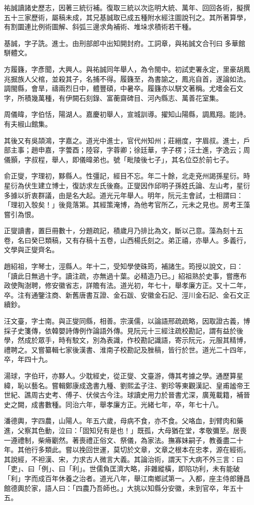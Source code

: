 \begin{pinyinscope}
祐誠讀諸史歷志，因著三統衍補。復取三統以次迄明大統、萬年、回回各術，擬撰五十三家歷術，屬稿未成，其兄基誠取已成五種附水經注圖說刊之。其所著算學，有割圜連比例術圖解、斜弧三邊求角補術、堆垛求積術若干種。

基誠，字子詵。進士。由刑部郎中出知開封府。工詞章，與祐誠文合刊曰多華館駢體文。

方履籛，字彥聞，大興人。與祐誠同年舉人，為令閩中。初試吏署永定，里豪胡鳳兆掘族人父棺，並殺其子，名捕不得。履籛至，為書諭之，鳳兆自首，遂論如法。調閩縣，會旱，禱兩烈日中，體豐碩，中暑卒。履籛亦以駢文著稱。尤嗜金石文字，所積幾萬種，有伊闕石刻錄、富蘅齋碑目、河內縣志、萬善花室集。

周儀暐，字伯恬，陽湖人。嘉慶初舉人，宣城訓導。擢知山陽縣，調鳳翔。能詩。有夫椒山館集。

其後又有吳頡鴻，字嘉之。道光中進士，官代州知州；莊縉度，字眉叔。進士，戶部主事；趙申嘉，字蕓酉；陸容，字蓉卿；徐廷華，字子楞；汪士進，字逸云；周儀顥，字叔程，舉人，即儀暐弟也。號「毗陵後七子」，其名位亞於前七子。

俞正燮，字理初，黟縣人。性彊記，經目不忘。年二十餘，北走兗州謁孫星衍。時星衍為伏生建立博士，復訪求左氏後裔。正燮因作邱明子孫姓氏論、左山考，星衍多據以折衷群議，由是名大起。道光元年舉人。明年，阮元主會試，士相謂曰：「理初入彀矣！」後竟落第。其經策淹博，為他考官所乙，元未之見也。房考王藻嘗引為恨。

正燮讀書，置巨冊數十，分題疏記，積歲月乃排比為文，斷以己意。藻為刻十五卷，名曰癸巳類稿，又有存稿十五卷，山西楊氏刻之。弟正禧，亦舉人。多義行，文學與正燮齊名。

趙紹祖，字琴士，涇縣人。年十二，受知學使硃筠，補諸生。筠授以說文，曰：「讀此日無過十字。讀注疏，亦無過十葉。必精造乃已。」紹祖熟於史事，嘗應布政使陶澍聘，修安徽省志，詳贍有法。道光初，年七十，舉孝廉方正。又十二年，卒。注有通鑒注商、新舊唐書互證、金石跋、安徽金石記、涇川金石記、金石文正續鈔。

汪文臺，字士南。與正燮同縣，相善。宗漢儒，以論語邢疏疏略，因取證古義，博採子史箋傳，依韓嬰詩傳例作論語外傳。見阮元十三經注疏校勘記，謂有益於後學，然成於眾手，時有駮文，別為表識，作校勘記識語，寄示阮元，元服其精博，禮聘之。又嘗纂輯七家後漢書、淮南子校勘記及脞稿，皆行於世。道光二十四年，卒，年四十九。

湯球，字伯玕，亦黟人。少耽經史，從正燮、文臺游，傳其考據之學。通歷算星緯，恥以藝名。嘗輯鄭康成逸書九種、劉熙孟子注、劉珍等東觀漢記、皇甫謐帝王世紀、譙周古史考、傅子、伏侯古今注。球讀史用力於晉書尤深，廣蒐載籍，補晉史之闕，成書數種。同治六年，舉孝廉方正。光緒七年，卒，年七十八。

潘德輿，字四農，山陽人。年五六歲，母病不食，亦不食。父咯血，刲臂肉和藥進，父察其色動，泣曰：「固知兒有是也！」既孤，大母猶在堂，孝敬彌至。居喪一遵禮制，柴瘠劚然。著喪禮正俗文、祭儀，為家法。撫寡妹嗣子，教養盡二十年。其他行多類此。嘗以挽回世運，莫切於文章，文章之根本在忠孝，源在經術。其說經，不袒漢、宋，力求古人微言大義。其論治術，謂天下大病不外三言：曰「吏」、曰「例」、曰「利」。世儒負匡濟大略，非雜縱橫，即陷功利，未有能破「利」字而成百年休養之治者。道光八年，舉江南鄉試第一。入都，座主侍郎鍾昌館德輿於家，語人曰：「四農乃吾師也。」大挑以知縣分安徽，未到官卒，年五十五。


\end{pinyinscope}
